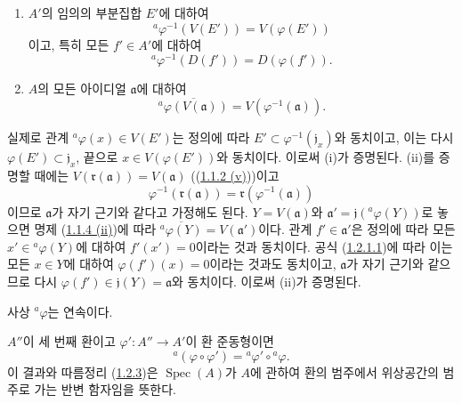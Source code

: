 \begin{proposition}[1.2.2]
\label{I.1.2.2-ko}
\begin{enumerate}
  \item[\rm(i)] $A'$의 임의의 부분집합 $E'$에 대하여
  \begin{equation}
    {}^a\varphi^{-1}(V(E'))=V(\varphi(E'))
    \tag{1.2.2.1}\label{I.1.2.2.1-ko}
  \end{equation}
  이고, 특히 모든 $f'\in A'$에 대하여
  \begin{equation}
    {}^a\varphi^{-1}(D(f'))=D(\varphi(f')).
    \tag{1.2.2.2}\label{I.1.2.2.2-ko}
  \end{equation}
  \item[\rm(ii)] $A$의 모든 아이디얼 $\mathfrak{a}$에 대하여
  \begin{equation}
    \overline{{}^a\varphi(V(\mathfrak{a}))}
    =V(\varphi^{-1}(\mathfrak{a})).
    \tag{1.2.2.3}\label{I.1.2.2.3-ko}
  \end{equation}
\end{enumerate}
\end{proposition}

실제로 관계 ${}^a\varphi(x)\in V(E')$는 정의에 따라
$E'\subset\varphi^{-1}(\mathfrak{j}_x)$와 동치이고, 이는 다시
$\varphi(E')\subset\mathfrak{j}_x$, 끝으로
$x\in V(\varphi(E'))$와 동치이다. 이로써 (i)가 증명된다. (ii)를
증명할 때에는 $V(\mathfrak{r}(\mathfrak{a}))=V(\mathfrak{a})$
((\hyperref[I.1.1.2-ko]{1.1.2 (v)}))이고
\[
  \varphi^{-1}(\mathfrak{r}(\mathfrak{a}))
  =\mathfrak{r}(\varphi^{-1}(\mathfrak{a}))
\]
이므로 $\mathfrak{a}$가 자기 근기와 같다고 가정해도 된다.
$Y=V(\mathfrak{a})$와
$\mathfrak{a}'=\mathfrak{j}({}^a\varphi(Y))$로 놓으면 명제
(\hyperref[I.1.1.4-ko]{1.1.4 (ii)})에 따라
$\overline{{}^a\varphi(Y)}=V(\mathfrak{a}')$이다. 관계
$f'\in\mathfrak{a}'$은 정의에 따라 모든
$x'\in{}^a\varphi(Y)$에 대하여 $f'(x')=0$이라는 것과 동치이다.
공식 (\hyperref[I.1.2.1.1-ko]{1.2.1.1})에 따라 이는 모든
$x\in Y$에 대하여 $\varphi(f')(x)=0$이라는 것과도 동치이고,
$\mathfrak{a}$가 자기 근기와 같으므로 다시
$\varphi(f')\in\mathfrak{j}(Y)=\mathfrak{a}$와 동치이다. 이로써
(ii)가 증명된다.

\begin{corollary}[1.2.3]
\label{I.1.2.3-ko}
사상 ${}^a\varphi$는 연속이다.
\end{corollary}

$A''$이 세 번째 환이고 $\varphi':A''\to A'$이 환 준동형이면
\[
  {}^a(\varphi\circ\varphi')={}^a\varphi'\circ{}^a\varphi.
\]
이 결과와 따름정리 (\hyperref[I.1.2.3-ko]{1.2.3})은
$\operatorname{Spec}(A)$가 $A$에 관하여 환의 범주에서 위상공간의
범주로 가는 반변 함자임을 뜻한다.

